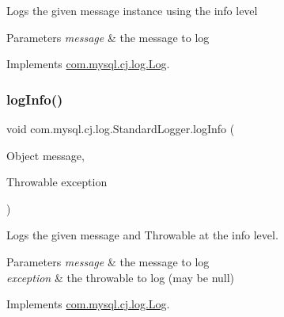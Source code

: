 Logs the given message instance using the \textquotesingle{}info\textquotesingle{} level


\begin{DoxyParams}{Parameters}
{\em message} & the message to log \\
\hline
\end{DoxyParams}


Implements \mbox{\hyperlink{interfacecom_1_1mysql_1_1cj_1_1log_1_1_log_a7f117433067520dd682da12ff9194f4b}{com.\+mysql.\+cj.\+log.\+Log}}.

\mbox{\label{classcom_1_1mysql_1_1cj_1_1log_1_1_standard_logger_a9086549846486165e052a7e1ce190864}} 
\subsubsection{\texorpdfstring{log\+Info()}{logInfo()}\hspace{0.1cm}{\footnotesize\ttfamily [2/2]}}
{\footnotesize\ttfamily void com.\+mysql.\+cj.\+log.\+Standard\+Logger.\+log\+Info (\begin{DoxyParamCaption}\item[{Object}]{message,  }\item[{Throwable}]{exception }\end{DoxyParamCaption})}

Logs the given message and Throwable at the \textquotesingle{}info\textquotesingle{} level.


\begin{DoxyParams}{Parameters}
{\em message} & the message to log \\
\hline
{\em exception} & the throwable to log (may be null) \\
\hline
\end{DoxyParams}


Implements \mbox{\hyperlink{interfacecom_1_1mysql_1_1cj_1_1log_1_1_log_abad2a5a44ff04b24bf46a58997e4f7da}{com.\+mysql.\+cj.\+log.\+Log}}.

\mbox{\label{classcom_1_1mysql_1_1cj_1_1log_1_1_standard_logger_afcee91b3229c2c03530120c1a7842342}} 
